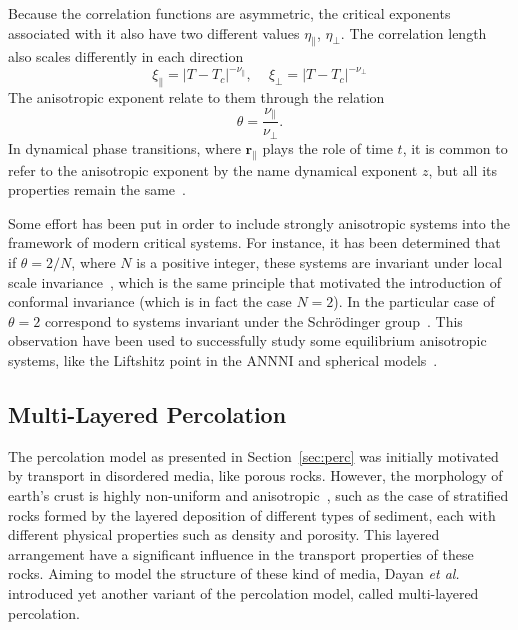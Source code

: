 Because the correlation functions are asymmetric, the critical exponents
associated with it also have two different values $\eta_\parallel$,
$\eta_\perp$. The correlation length also scales differently in each direction
\begin{equation}
    \xi_{\parallel}=
    \left|T-T_{c}\right|^{-\nu_{\parallel}},
    \,\,\,\,\,\,\,
    \xi_{\perp}=\left|T-T_{c}\right|^{-\nu_{\perp}}
\end{equation}
The anisotropic exponent relate to them through the relation
\begin{equation}
    \theta = \frac{\nu_\parallel}{\nu_\perp}.
\end{equation}
In dynamical phase transitions, where $\mathbf{r}_\parallel$ plays the role of
time $t$, it is common to refer to the anisotropic exponent by the name
dynamical exponent $z$, but all its properties remain the
same~\cite{Henkel1994}.

Some effort has been put in order to include strongly anisotropic systems into
the framework of modern critical systems. For instance, it has been determined
that if $\theta=2/N$, where $N$ is a positive integer, these systems are invariant
under local scale invariance~\cite{Henkel2003}, which is the same principle
that motivated the introduction of conformal invariance (which is in fact the
case $N=2$). In the particular case of $\theta=2$ correspond to systems invariant
under the Schr\"odinger group~\cite{Henkel1992}. This observation have been
used to successfully study some equilibrium anisotropic systems, like the
Liftshitz point in the ANNNI and spherical models~\cite{Henkel2010}.


\subsection{Multi-Layered Percolation}
\label{sec:mlp}

The percolation model as presented in Section~\ref{sec:perc} was initially
motivated by transport in disordered media, like porous rocks. However, the
morphology of earth's crust is highly non-uniform and
anisotropic~\cite{Englman1986}, such as the case of stratified rocks formed by
the layered deposition of different types of sediment, each with different
physical properties such as density and porosity. This layered arrangement have
a significant influence in the transport properties of these rocks. Aiming to
model the structure of these kind of media, Dayan \textit{et
al.}~\cite{Dayan1991} introduced yet another variant of the percolation
model, called multi-layered percolation. 

